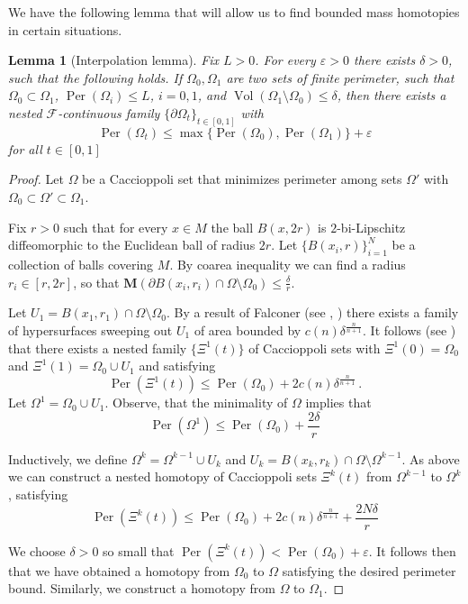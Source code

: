 \documentclass[12pt,twoside]{amsart}
\numberwithin{equation}{section}
\renewcommand{\leq}{\leqslant}
\newtheorem{lemma}[theorem]{Lemma}
\newcommand{\Om}{\Omega}
\newcommand{\cF}{\mathcal F}
\newcommand{\bM}{\mathbf{M}}
\DeclareMathOperator{\Per}{Per}
\DeclareMathOperator{\Vol}{Vol}
\newcommand{\eps}{\varepsilon}
\begin{document}
We have the following lemma that will allow us to find bounded mass homotopies in certain situations. 
\begin{lemma}[Interpolation lemma] \label{l:close in flat}
	Fix $L>0$. For every $\eps>0$ there exists $\delta>0$, such that the following holds. If $\Om_0,\Om_1 $ are two sets of finite perimeter, such that $\Om_0 \subset \Om_1$, $\Per(\Om_i) \leq L$, $i=0,1$, and $\Vol(\Om_1 \setminus \Om_0)\leq \delta$, then there exists a nested $\cF$-continuous family $\{\partial\Om_t \}_{t \in [0,1]}$ with 
\[
\Per(\Om_t)\leq \max\{\Per(\Om_0),\Per(\Om_1) \}+\eps
\]
for all $t\in[0,1]$
\end{lemma}
\begin{proof}
Let $\Om$ be a Caccioppoli set that minimizes
perimeter among sets $\Om'$
with $\Om_0 \subset \Om' \subset \Om_1$.

Fix $r>0$ such that for every $x \in M$ the ball $B(x,2r)$
is $2$-bi-Lipschitz diffeomorphic to
the Euclidean ball of radius $2r$.
Let $\{B(x_i,r) \}_{i=1}^N$ be a collection of balls covering $M$. By coarea inequality
we can find a radius $r_i \in [r,2r]$,
so that $\bM(\partial B(x_i,r_i) \cap \Om \setminus \Om_0) \leq \frac{\delta}{r}$.

Let $U_1 = B(x_1,r_1) \cap
\Om \setminus \Om_0$.
By a result of Falconer (see \cite{Falconer},
\cite[Appendix 6]{Guth}) there exists a family of 
hypersurfaces sweeping out $U_1$ of area bounded by
$c(n) \delta^{\frac{n}{n+1}}$. It follows (see
\cite[Lemma 5.3]{CL}) that
there exists a nested family 
$\{ \Xi^1(t)\} $ of Caccioppoli sets with
$\Xi^1(0) = \Om_0$ and $\Xi^1(1) = \Om_0 \cup U_1$
and satisfying
$$\Per(\Xi^1(t)) \leq \Per(\Om_0)+2c(n)\delta^{\frac{n}{n+1}} \, . $$
Let $\Om^1 =  \Om_0 \cup U_1$. Observe, that
the minimality of $\Om$ implies that
$$\Per(\Om^1) \leq \Per(\Om_0) + \frac{2\delta}{r} $$

Inductively, we define $\Om^k= \Om^{k-1} \cup U_k$ and
$U_k = B(x_k,r_k) \cap
\Om \setminus \Om^{k-1}$. As above we can construct a nested homotopy of Caccioppoli sets $\Xi^k(t)$ from $\Om^{k-1}$ to $\Om^k$, satisfying
$$\Per(\Xi^k(t)) \leq \Per(\Om_0)+2c(n)\delta^{\frac{n}{n+1}} 
+ \frac{2N\delta}{r}$$

We choose $\delta>0$ so small that $\Per(\Xi^k(t))<  \Per(\Om_0) + \eps$.
It follows then that we have obtained a homotopy from $\Om_0$ to $\Om$ satisfying the
desired perimeter bound. Similarly,
we construct a homotopy from $\Om$ to $\Om_1$.
\end{proof}
\end{document}
